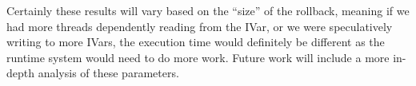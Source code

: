 Certainly these results will vary based on the ``size'' of the rollback, meaning if we had more threads dependently reading from the IVar, or we were speculatively writing to more IVars, the execution time would definitely be different as the runtime system would need to do more work.  Future work will include a more in-depth analysis of these parameters.
